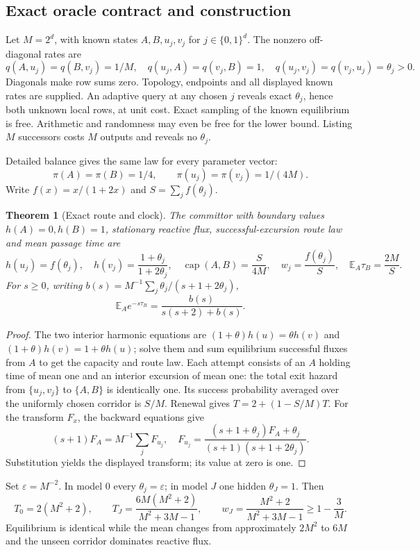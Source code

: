 \documentclass[11pt]{article}
\newtheorem{theorem}{Theorem}
\newcommand{\E}{\mathbb E}
\begin{document}
\subsection{Exact oracle contract and construction}

Let $M=2^d$, with known states $A,B,u_j,v_j$ for $j\in\{0,1\}^d$.
The nonzero off-diagonal rates are
\[
 q(A,u_j)=q(B,v_j)=1/M,\quad q(u_j,A)=q(v_j,B)=1,\quad
 q(u_j,v_j)=q(v_j,u_j)=\theta_j>0.
\]
Diagonals make row sums zero. Topology, endpoints and all displayed known
rates are supplied. An adaptive query at any chosen $j$ reveals exact
$\theta_j$, hence both unknown local rows, at unit cost.
Exact sampling of the known equilibrium is free. Arithmetic and randomness
may even be free for the lower bound. Listing $M$ successors costs $M$ outputs
and reveals no $\theta_j$.

Detailed balance gives the same law for every parameter vector:
\[
 \pi(A)=\pi(B)=1/4,\qquad \pi(u_j)=\pi(v_j)=1/(4M).
\]
Write $f(x)=x/(1+2x)$ and $S=\sum_j f(\theta_j)$.

\begin{theorem}[Exact route and clock]\label{thm:corridor}
The committor with boundary values $h(A)=0,h(B)=1$, stationary reactive flux,
successful-excursion route law and mean passage time are
\[
 h(u_j)=f(\theta_j),\quad
 h(v_j)=\frac{1+\theta_j}{1+2\theta_j},\quad
 \operatorname{cap}(A,B)=\frac{S}{4M},\quad
 w_j=\frac{f(\theta_j)}{S},\quad \E_A\tau_B=\frac{2M}{S}.
\]
For $s\ge0$, writing
$b(s)=M^{-1}\sum_j\theta_j/(s+1+2\theta_j)$,
\[
 \E_Ae^{-s\tau_B}=\frac{b(s)}{s(s+2)+b(s)}.
\]
\end{theorem}
\begin{proof}
The two interior harmonic equations are
$(1+\theta)h(u)=\theta h(v)$ and
$(1+\theta)h(v)=1+\theta h(u)$; solve them and sum equilibrium successful
fluxes from $A$ to get the capacity and route law.
Each attempt consists of an $A$ holding time of mean one and an interior
excursion of mean one: the total exit hazard from $\{u_j,v_j\}$ to
$\{A,B\}$ is identically one. Its success probability averaged over the
uniformly chosen corridor is $S/M$. Renewal gives $T=2+(1-S/M)T$.
For the transform $F_x$, the backward equations give
\[
 (s+1)F_A=M^{-1}\sum_jF_{u_j},\quad
 F_{u_j}=\frac{(s+1+\theta_j)F_A+\theta_j}{(s+1)(s+1+2\theta_j)}.
\]
Substitution yields the displayed transform; its value at zero is one.
\end{proof}

Set $\varepsilon=M^{-2}$. In model 0 every $\theta_j=\varepsilon$;
in model $J$ one hidden $\theta_J=1$. Then
\[
 T_0=2(M^2+2),\qquad
 T_J=\frac{6M(M^2+2)}{M^2+3M-1},\qquad
 w_J=\frac{M^2+2}{M^2+3M-1}\ge1-\frac3M.
\]
Equilibrium is identical while the mean changes from approximately $2M^2$
to $6M$ and the unseen corridor dominates reactive flux.
\end{document}
